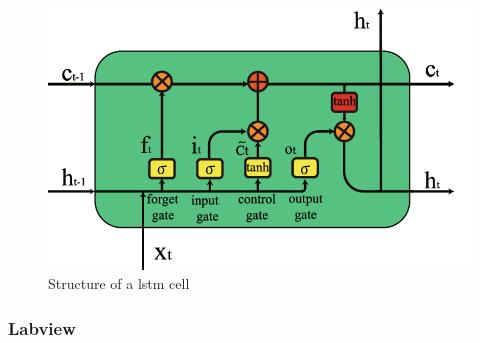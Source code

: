 \begin{figure}[h]
    \centering
    \includegraphics[scale=0.25]{images/lstm_cell.png}
    \caption{Structure of a \acrshort{lstm} cell}
    \label{fig:lstm_cell}
\end{figure}

\subsubsection{Labview}


